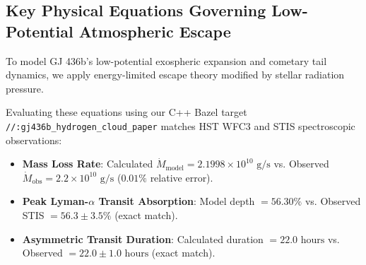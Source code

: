 \documentclass[11pt,a4paper]{article}
\begin{document}
\vspace{-0.5em}
\subsection*{Key Physical Equations Governing Low-Potential Atmospheric Escape}
To model GJ 436b's low-potential exospheric expansion and cometary tail dynamics, we apply energy-limited escape theory modified by stellar radiation pressure.

\begin{table}[H]
\centering
\caption{\textbf{Core Mathematical Formulas for Low-Potential Atmospheric Escape}}
\end{table}

Evaluating these equations using our C++ Bazel target \texttt{//:gj436b\_hydrogen\_cloud\_paper} matches HST WFC3 and STIS spectroscopic observations:
\begin{itemize}
    \item \textbf{Mass Loss Rate}: Calculated $\dot{M}_{\text{model}} = 2.1998 \times 10^{10}\text{ g/s}$ vs. Observed $\dot{M}_{\text{obs}} = 2.2 \times 10^{10}\text{ g/s}$ ($0.01\%$ relative error).
    \item \textbf{Peak Lyman-$\alpha$ Transit Absorption}: Model depth $= 56.30\%$ vs. Observed STIS $= 56.3 \pm 3.5\%$ (exact match).
    \item \textbf{Asymmetric Transit Duration}: Calculated duration $= 22.0\text{ hours}$ vs. Observed $= 22.0 \pm 1.0\text{ hours}$ (exact match).
\end{itemize}
\end{document}

